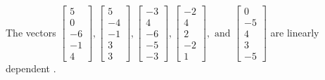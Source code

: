 \begin{exercise}
\begin{exerciseStatement}
  \end{exerciseStatement}
  \begin{exerciseAnswer}
   The vectors \(\left[\begin{array}{r}
5 \\
0 \\
-6 \\
-1 \\
4
\end{array}\right] , \left[\begin{array}{r}
5 \\
-4 \\
-1 \\
3 \\
3
\end{array}\right] , \left[\begin{array}{r}
-3 \\
4 \\
-6 \\
-5 \\
-3
\end{array}\right] , \left[\begin{array}{r}
-2 \\
4 \\
2 \\
-2 \\
1
\end{array}\right] , \text{ and } \left[\begin{array}{r}
0 \\
-5 \\
4 \\
3 \\
-5
\end{array}\right]\) are 
  	 linearly dependent  .
  


  \end{exerciseAnswer}
\end{exercise}